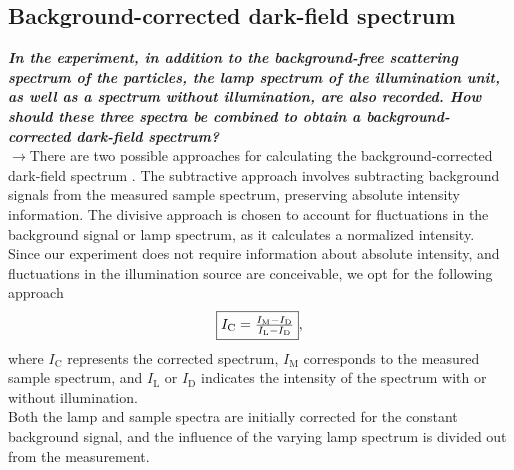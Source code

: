 \subsection{\label{subsec:FZV6}Background-corrected dark-field spectrum}
\textbf{\textit{In the experiment, in addition to the background-free scattering spectrum of the particles, 
the lamp spectrum of the illumination unit, as well as a spectrum without illumination, are also recorded. 
How should these three spectra be combined to obtain a background-corrected dark-field spectrum?}} \\
$\rightarrow$There are two possible approaches for calculating the background-corrected dark-field 
spectrum \cite{FZV5}. The subtractive approach involves subtracting background signals from the measured 
sample spectrum, preserving absolute intensity information. The divisive approach is chosen to account for 
fluctuations in the background signal or lamp spectrum, as it calculates a normalized intensity. \\
Since our experiment does not require information about absolute intensity, and fluctuations in the 
illumination source are conceivable, we opt for the following approach
\begin{equation}\label{eq:korr}
    \fbox{$I_{\text{C}} = \frac{I_{\text{M}}-I_{\text{D}}}{I_{\text{L}}-I_{\text{D}}}$},
\end{equation}
where $I_{\text{C}}$ represents the corrected spectrum, 
$I_{\text{M}}$ corresponds to the measured sample spectrum, and $I_{\text{L}}$ or $I_{\text{D}}$ 
indicates the intensity of the spectrum with or without illumination. \\
Both the lamp and sample spectra are initially corrected for the constant background signal, and 
the influence of the varying lamp spectrum is divided out from the measurement. \\